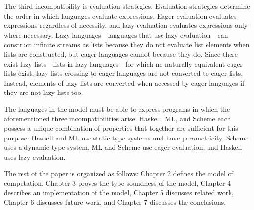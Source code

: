 The third incompatibility is evaluation strategies.  Evaluation strategies determine the order in which languages evaluate expressions.  Eager evaluation evaluates expressions regardless of necessity, and lazy evaluation evaluates expressions only where necessary.  Lazy languages---languages that use lazy evaluation---can construct infinite streams as lists because they do not evaluate list elements when lists are constructed, but eager languages cannot because they do.  Since there exist lazy lists---lists in lazy languages---for which no naturally equivalent eager lists exist, lazy lists crossing to eager languages are not converted to eager lists.  Instead, elements of lazy lists are converted when accessed by eager languages if they are not lazy lists too.

The languages in the model must be able to express programs in which the aforementioned three incompatibilities arise.  Haskell, ML, and Scheme each possess a unique combination of properties that together are sufficient for this purpose: Haskell and ML use static type systems and have parametricity, Scheme uses a dynamic type system, ML and Scheme use eager evaluation, and Haskell uses lazy evaluation.

The rest of the paper is organized as follows: Chapter 2 defines the model of computation, Chapter 3 proves the type soundness of the model, Chapter 4 describes an implementation of the model, Chapter 5 discusses related work, Chapter 6 discusses future work, and Chapter 7 discusses the conclusions.